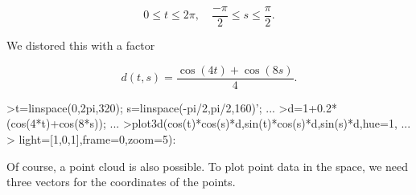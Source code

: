 \documentclass[a4paper,10pt]{article}
\begin{document}
\begin{eulernotebook}
\begin{eulercomment}
\end{eulercomment}
\begin{eulerformula}
\[
0 \le t \le 2\pi, \quad \frac{-\pi}{2} \le s \le \frac{\pi}{2}.
\]
\end{eulerformula}
\begin{eulercomment}
We distored this with a factor

\end{eulercomment}
\begin{eulerformula}
\[
d(t,s) = \frac{\cos(4t)+\cos(8s)}{4}.
\]
\end{eulerformula}
\begin{eulerprompt}
>t=linspace(0,2pi,320); s=linspace(-pi/2,pi/2,160)'; ...
>d=1+0.2*(cos(4*t)+cos(8*s)); ...
>plot3d(cos(t)*cos(s)*d,sin(t)*cos(s)*d,sin(s)*d,hue=1, ...
>  light=[1,0,1],frame=0,zoom=5):
\end{eulerprompt}
\begin{eulercomment}
Of course, a point cloud is also possible. To plot point data in the space, we need three vectors for the coordinates of
the points.


\end{eulercomment}
\end{eulernotebook}
\end{document}
